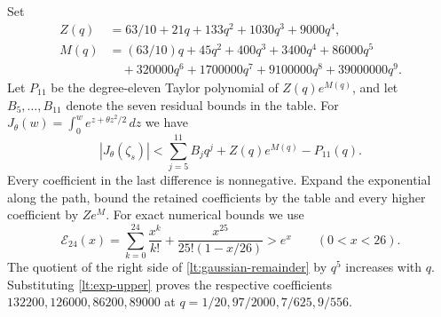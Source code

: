 Set
\begin{align*}
 Z(q)&=63/10+21q+133q^2+1030q^3+9000q^4,\\
 M(q)&=(63/10)q+45q^2+400q^3+3400q^4+86000q^5\\
     &\quad+320000q^6+1700000q^7+9100000q^8+39000000q^9.
\end{align*}
Let $P_{11}$ be the degree-eleven Taylor polynomial of $Z(q)e^{M(q)}$,
and let $B_5,\ldots,B_{11}$ denote the seven residual bounds in the
table. For $J_\theta(w)=\int_0^we^{z+\theta z^2/2}\,dz$ we have
\begin{equation}\label{lt:gaussian-remainder}
 |J_\theta(\zeta_s)|
 <\sum_{j=5}^{11}B_jq^j+Z(q)e^{M(q)}-P_{11}(q).
\end{equation}
Every coefficient in the last difference is nonnegative. Expand the
exponential along the path, bound the retained coefficients by the table
and every higher coefficient by $Z e^M$.
For exact numerical bounds we use
\begin{equation}\label{lt:exp-upper}
 \mathcal E_{24}(x)=\sum_{k=0}^{24}\frac{x^k}{k!}
       +\frac{x^{25}}{25!(1-x/26)}>e^x\qquad(0<x<26).
\end{equation}
The quotient of the right side of \eqref{lt:gaussian-remainder} by
$q^5$ increases with $q$. Substituting \eqref{lt:exp-upper} proves
the respective coefficients $132200,126000,86200,89000$ at
$q=1/20,97/2000,7/625,9/556$.

